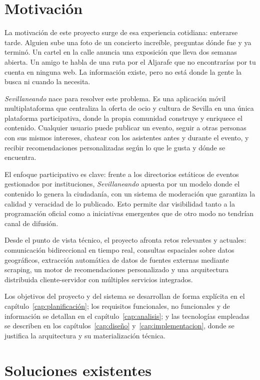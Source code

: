 \section{Motivación}

La motivación de este proyecto surge de esa experiencia cotidiana: enterarse tarde. Alguien sube una foto de un concierto increíble, preguntas dónde fue y ya terminó. Un cartel en la calle anuncia una exposición que lleva dos semanas abierta. Un amigo te habla de una ruta por el Aljarafe que no encontrarías por tu cuenta en ninguna web. La información existe, pero no está donde la gente la busca ni cuando la necesita.

\textit{Sevillaneando} nace para resolver este problema. Es una aplicación móvil multiplataforma que centraliza la oferta de ocio y cultura de Sevilla en una única plataforma participativa, donde la propia comunidad construye y enriquece el contenido. Cualquier usuario puede publicar un evento, seguir a otras personas con sus mismos intereses, chatear con los asistentes antes y durante el evento, y recibir recomendaciones personalizadas según lo que le gusta y dónde se encuentra.

El enfoque participativo es clave: frente a los directorios estáticos de eventos gestionados por instituciones, \textit{Sevillaneando} apuesta por un modelo donde el contenido lo genera la ciudadanía, con un sistema de moderación que garantiza la calidad y veracidad de lo publicado. Esto permite dar visibilidad tanto a la programación oficial como a iniciativas emergentes que de otro modo no tendrían canal de difusión.

Desde el punto de vista técnico, el proyecto afronta retos relevantes y actuales: comunicación bidireccional en tiempo real, consultas espaciales sobre datos geográficos, extracción automática de datos de fuentes externas mediante scraping, un motor de recomendaciones personalizado y una arquitectura distribuida cliente-servidor con múltiples servicios integrados.

Los objetivos del proyecto y del sistema se desarrollan de forma explícita en el capítulo~\ref{cap:planificación}; los requisitos funcionales, no funcionales y de información se detallan en el capítulo~\ref{cap:analisis}; y las tecnologías empleadas se describen en los capítulos~\ref{cap:diseño} y~\ref{cap:implementacion}, donde se justifica la arquitectura y su materialización técnica.

\section{Soluciones existentes}

